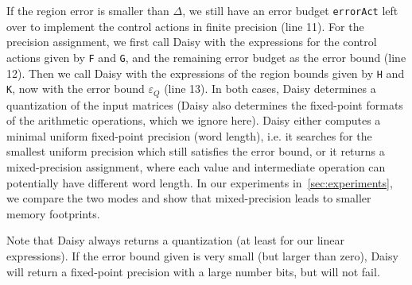 
If the region error is smaller than $\Delta$, we still have an error budget \texttt{errorAct} left
over to implement the control actions in finite precision (line 11).
For the precision assignment, we first call Daisy with the expressions for the
control actions given by \texttt{F} and \texttt{G}, and the remaining error
budget as the error bound (line 12).
Then we call Daisy with the expressions of the region bounds given by \texttt{H}
and \texttt{K}, now with the error bound $\varepsilon_Q$ (line 13).
In both cases, Daisy determines a quantization of the input matrices (Daisy also
determines the fixed-point formats of the arithmetic operations, which we ignore here).
Daisy either computes a minimal uniform fixed-point precision (word length),
i.e. it searches for the smallest uniform precision which still satisfies the
error bound, or it returns a mixed-precision assignment, where each value and
intermediate operation can potentially have different word length.
In our experiments in~\autoref{sec:experiments}, we compare the two modes and show
that mixed-precision leads to smaller memory footprints.

Note that Daisy always returns a quantization (at least for our linear
expressions). If the error bound given is very small (but larger than zero),
Daisy will return a fixed-point precision with a large number bits, but will not
fail.



